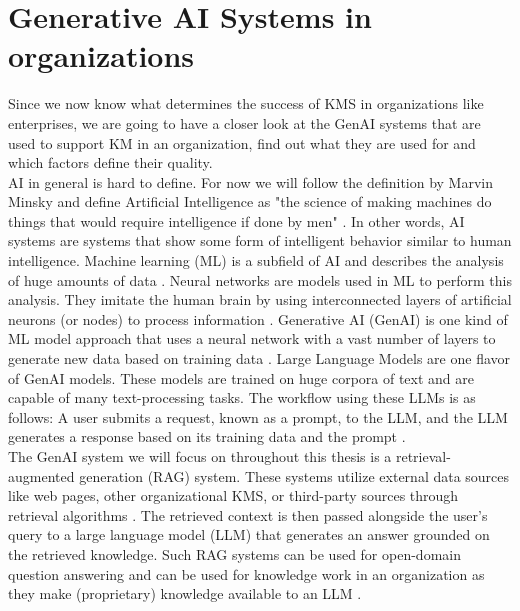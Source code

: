\documentclass[
	english,
	ruledheaders=section,%
	class=report,%
	thesis={type=bachelor},%
	accentcolor=1b,%
	custommargins=true,%
	marginpar=false,%
	parskip=half-,%
	fontsize=11pt,%
	DIV=14,
]{tudapub}
\begin{document}
\section{Generative AI Systems in organizations}
Since we now know what determines the success of KMS in organizations like enterprises, we are going to have a closer look at the GenAI systems that are used to support KM in an organization, find out what they are used for and which factors define their quality.\\
AI in general is hard to define. For now we will follow the definition by Marvin Minsky and define Artificial Intelligence as "the science of making machines do things that would require intelligence if done by men" \parencite{MinskyBritannica}. In other words, AI systems are systems that show some form of intelligent behavior similar to human intelligence. Machine learning (ML) is a subfield of AI and describes the analysis of huge amounts of data \parencite{Lund2023}. Neural networks are models used in ML to perform this analysis. They imitate the human brain by using interconnected layers of artificial neurons (or nodes) to process information \parencite{Lund2023}. Generative AI (GenAI) is one kind of ML model approach that uses a neural network with a vast number of layers to generate new data based on training data \parencite{Lund2023}.
Large Language Models are one flavor of GenAI models. These models are trained on huge corpora of text and are capable of many text-processing tasks. The workflow using these LLMs is as follows: A user submits a request, known as a prompt, to the LLM, and the LLM generates a response based on its training data and the prompt \parencite{Lund2023}.\\
The GenAI system we will focus on throughout this thesis is a retrieval-augmented generation (RAG) system. These systems utilize external data sources like web pages, other organizational KMS, or third-party sources through retrieval algorithms \parencite{AWS_RAG}. The retrieved context is then passed alongside the user's query to a large language model (LLM) that generates an answer grounded on the retrieved knowledge. Such RAG systems can be used for open-domain question answering and can be used for knowledge work in an organization as they make (proprietary) knowledge available to an LLM \parencite{Lewis2021}.\\
\end{document}
